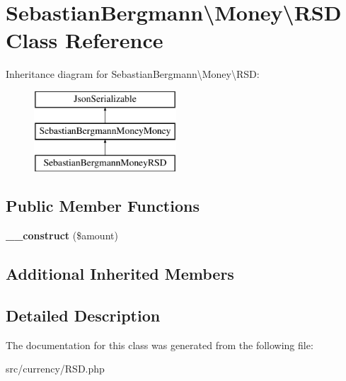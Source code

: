 \hypertarget{classSebastianBergmann_1_1Money_1_1RSD}{}\section{Sebastian\+Bergmann\textbackslash{}Money\textbackslash{}R\+S\+D Class Reference}
\label{classSebastianBergmann_1_1Money_1_1RSD}
Inheritance diagram for Sebastian\+Bergmann\textbackslash{}Money\textbackslash{}R\+S\+D\+:\begin{figure}[H]
\begin{center}
\leavevmode
\includegraphics[height=3.000000cm]{classSebastianBergmann_1_1Money_1_1RSD}
\end{center}
\end{figure}
\subsection*{Public Member Functions}
\begin{DoxyCompactItemize}
\item 
\hypertarget{classSebastianBergmann_1_1Money_1_1RSD_a469d657d3e2af7cdab22de5efedcd16b}{}{\bfseries \+\_\+\+\_\+construct} (\$amount)\label{classSebastianBergmann_1_1Money_1_1RSD_a469d657d3e2af7cdab22de5efedcd16b}

\end{DoxyCompactItemize}
\subsection*{Additional Inherited Members}


\subsection{Detailed Description}


The documentation for this class was generated from the following file\+:\begin{DoxyCompactItemize}
\item 
src/currency/R\+S\+D.\+php\end{DoxyCompactItemize}
